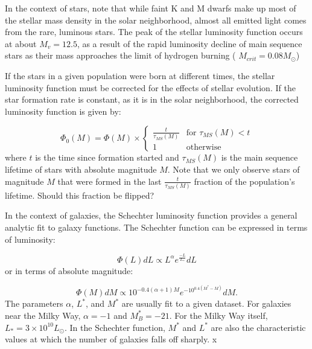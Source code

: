 In the context of stars, note that while faint K and M dwarfs make up most of
the stellar mass density in the solar neighborhood, almost all emitted light
comes from the rare, luminous stars.
The peak of the stellar luminosity function occurs at about $M_v = 12.5$, as a result of the rapid luminosity decline of main sequence stars as their mass approaches the limit of hydrogen burning ( $M_{crit} = 0.08 M_\odot$)

If the stars in a given population were born at different times, the stellar luminosity function must be corrected for the effects of stellar evolution. If the star formation rate is constant, as it is in the solar neighborhood,  the corrected luminosity function is given by:

 \begin{equation}
\Phi_0(M) = \Phi(M) \times
\begin{cases}
\frac{t}{\tau_{MS}(M)} & \text{for } \tau_{MS}(M)<t \\
1 & \text{otherwise}
\end{cases}
\end{equation} 
where $t$ is the time since formation started and $\tau_{MS}(M)$ is the main
sequence lifetime of stars with absolute magnitude $M$. Note that we only
observe stars of magnitude $M$ that were formed in the last
$\frac{t}{\tau_{MS}(M)}$ fraction of the population's lifetime.  Should this 
fraction be flipped?

In the context of galaxies, the Schechter luminosity function provides a general analytic fit to galaxy functions. The Schechter function can be expressed in terms of luminosity:

\begin{equation}
\Phi(L) dL \propto L^\alpha  e^{\frac{-L}{L_*}} dL
\end{equation}
or in terms of absolute magnitude:

\begin{equation}
\Phi(M) dM \propto 10^{-0.4(\alpha+1)M} e^{-10^{0.4(M^*-M)}} dM.
 \end{equation}
 The parameters $\alpha$, $L^*$, and $M^*$ are usually fit to a given dataset. For galaxies near the Milky Way, $\alpha = -1$ and $M^*_B = -21$. For the Milky Way itself, $L_* = 3\times 10^{10} L_\odot$. In the Schechter function, $M^*$ and $L^*$ are also the characteristic values at which the number of galaxies falls off sharply. x 

